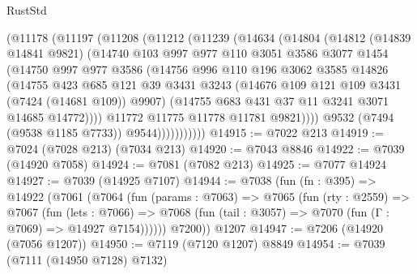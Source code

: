 \begin{lexlean}{RustStd}
\begin{coremodule}
{\begin{coremodule}
{{{{{{{{{{{{{{{{{{{{{{{{{{{{{{{{                (@11178
                  (@11197
                    (@11208
                      (@11212
                        (@11239
                          (@14634
                            (@14804
                              (@14812
                                (@14839 @14841 @9821)
                                (@14740
                                  @103
                                  @997
                                  @977
                                  @110
                                  @3051
                                  @3586
                                  @3077
                                  @1454
                                  (@14750
                                    @997
                                    @977
                                    @3586
                                    (@14756
                                      @996
                                      @110
                                      @196
                                      @3062
                                      @3585
                                      @14826
                                      (@14755
                                        @423
                                        @685
                                        @121
                                        @39
                                        @3431
                                        @3243
                                        (@14676 @109 @121 @109 @3431 (@7424 (@14681 @109)) @9907)
                                        (@14755 @683 @431 @37 @11 @3241 @3071 @14685 @14772))))
                                  @11772
                                  @11775
                                  @11778
                                  @11781
                                  @9821))))
                          @9532
                          (@7494 (@9538 @1185 @7733))
                          @9544)))))))))))
@14915 := @7022 @213
@14919 := @7024 (@7028 @213) (@7034 @213)
@14920 := @7043 @8846
@14922 := @7039 (@14920 @7058)
@14924 := @7081 (@7082 @213)
@14925 := @7077 @14924
@14927 := @7039 (@14925 @7107)
@14944 := @7038
    (fun (fn : @395) =>
    @14922
      (@7061
        (@7064
          (fun (params : @7063) =>
          @7065
            (fun (rty : @2559) =>
            @7067
              (fun (lets : @7066) =>
              @7068 (fun (tail : @3057) => @7070 (fun (Γ : @7069) => @14927 @7154))))))
        @7200))
    @1207
@14947 := @7206 (@14920 (@7056 @1207))
@14950 := @7119 (@7120 @1207) @8849
@14954 := @7039 (@7111 (@14950 @7128) @7132)
}}}}}}}}}}}}}}}}}}}}}}}}}}}}}}}}
\end{coremodule}}
\end{coremodule}
\end{lexlean}
